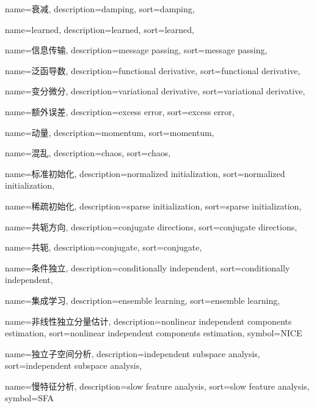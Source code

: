 {
  name=衰减,
  description={damping},
  sort={damping},
}

{
  name=learned,
  description={learned},
  sort={learned},
}

{
  name=信息传输,
  description={message passing},
  sort={message passing},
}

{
  name=泛函导数,
  description={functional derivative},
  sort={functional derivative},
}

{
  name=变分微分,
  description={variational derivative},
  sort={variational derivative},
}

{
  name=额外误差,
  description={excess error},
  sort={excess error},
}

{
  name=动量,
  description={momentum},
  sort={momentum},
}

{
  name=混乱,
  description={chaos},
  sort={chaos},
}

{
  name=标准初始化,
  description={normalized initialization},
  sort={normalized initialization},
}

{
  name=稀疏初始化,
  description={sparse initialization},
  sort={sparse initialization},
}

{
  name=共轭方向,
  description={conjugate directions},
  sort={conjugate directions},
}

{
  name=共轭,
  description={conjugate},
  sort={conjugate},
}

{
  name=条件独立,
  description={conditionally independent},
  sort={conditionally independent},
}

{
  name=集成学习,
  description={ensemble learning},
  sort={ensemble learning},
}

{
  name=非线性独立分量估计,
  description={nonlinear independent components estimation},
  sort={nonlinear independent components estimation},
  symbol={NICE}
}

{
  name=独立子空间分析,
  description={independent subspace analysis},
  sort={independent subspace analysis},
}

{
  name=慢特征分析,
  description={slow feature analysis},
  sort={slow feature analysis},
  symbol={SFA}
}

